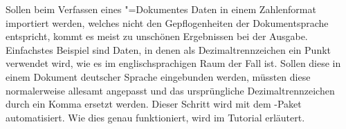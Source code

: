 Sollen beim Verfassen eines "=Dokumentes Daten in einem 
Zahlenformat importiert werden, welches nicht den Gepflogenheiten der 
Dokumentsprache entspricht, kommt es meist zu unschönen Ergebnissen bei der 
Ausgabe. Einfachstes Beispiel sind Daten, in denen als Dezimaltrennzeichen ein 
Punkt verwendet wird, wie es im englischsprachigen Raum der Fall ist. Sollen 
diese in einem Dokument deutscher Sprache eingebunden werden, müssten diese 
normalerweise allesamt angepasst und das ursprüngliche Dezimaltrennzeichen 
durch ein Komma ersetzt werden. Dieser Schritt wird mit dem \TUDScript-Paket 
 automatisiert. Wie dies genau funktioniert, wird im Tutorial 
 erläutert.%
%

